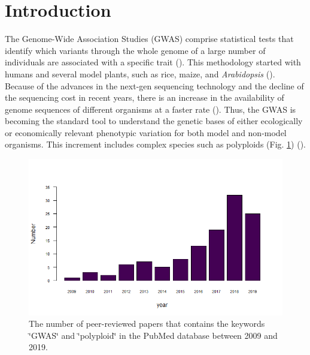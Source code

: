 \documentclass{article}
\begin{document}
\maketitle 

\section{Introduction}
The Genome-Wide Association Studies (GWAS) comprise statistical tests that identify which variants through the whole genome of a large number of individuals are associated with a specific trait (\cite{cantor2010prioritizing,begum2012comprehensive}). This methodology started with humans and several model plants, such as rice, maize, and \emph{Arabidopsis} (\cite{lauc2010genomics,tian2011genome,cao2011whole,korte2013advantages,han2013sequencing}). Because of the advances in the next-gen sequencing technology and the decline of the sequencing cost in recent years, there is an increase in the availability of genome sequences of different organisms at a faster rate (\cite{ekblom2011applications,ellegren2014genome}). Thus, the GWAS is becoming the standard tool to understand the genetic bases of either ecologically or economically relevant phenotypic variation for both model and non-model organisms. This increment includes complex species such as polyploids (Fig. \ref{GWASpolyploids}) (\cite{ekblom2011applications,santure2018wild}).

\begin{figure}[H]
\begin{centering}
\includegraphics[width=12cm]{images/GWASpolyploids_Pubmed.png}
\par\end{centering}
\caption{The number of peer-reviewed papers that contains the keywords \char`\"{}GWAS\char`\"{} and \char`\"{}polyploid\char`\"{} in the PubMed database between 2009 and 2019.\label{GWASpolyploids}}
\end{figure}
\end{document}
